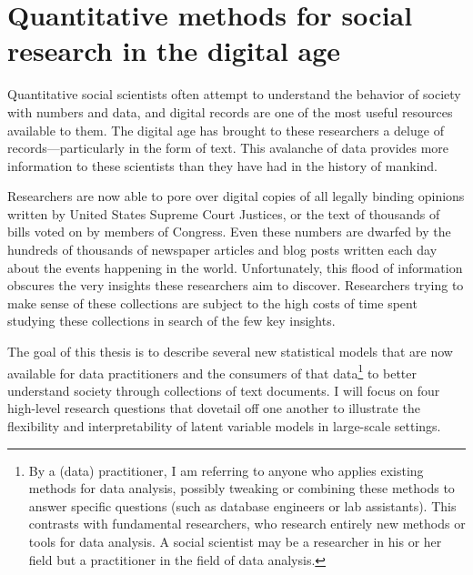 \chapter{Quantitative methods for social research in the digital age}

Quantitative social scientists often attempt to understand the
behavior of society with numbers and data, and digital records are one of the
most useful resources available to them.  The digital age has brought
to these researchers a deluge of records---particularly in the
form of text.  This avalanche of data provides more information to
these scientists than they have had in the history of mankind.

Researchers are now able to pore over digital copies of all legally
binding opinions written by United States Supreme Court Justices, or
the text of thousands of bills voted on by members of Congress.  Even
these numbers are dwarfed by the hundreds of thousands of newspaper
articles and blog posts written each day about the events happening in
the world.  Unfortunately, this flood of information obscures the very
insights these researchers aim to discover.  Researchers trying to
make sense of these collections are subject to the high costs of time
spent studying these collections in search of the few key insights.

The goal of this thesis is to describe several new statistical models
that are now available for data practitioners and the consumers of that
data\footnote{By a (data) practitioner, I am referring to anyone who
  applies existing methods for data analysis, possibly tweaking or
  combining these methods to answer specific questions (such as
  database engineers or lab assistants). This contrasts with
  fundamental researchers, who research entirely new methods or tools
  for data analysis.  A social scientist may be a researcher
  in his or her field but a practitioner in the field of data
  analysis.} to better understand society through collections of
text documents.  I will focus on four high-level research questions
that dovetail off one another to illustrate the flexibility and
interpretability of latent variable models in large-scale settings.

